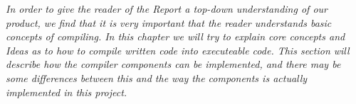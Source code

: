 \textit{In order to give the reader of the Report a top-down understanding of our product, we find that it is very important that the reader understands basic concepts of compiling. In this chapter we will try to explain core concepts and Ideas as to how to compile written code into executeable code. This section will describe how the compiler components can be implemented, and there may be some differences between this and the way the components is actually implemented in this project.}